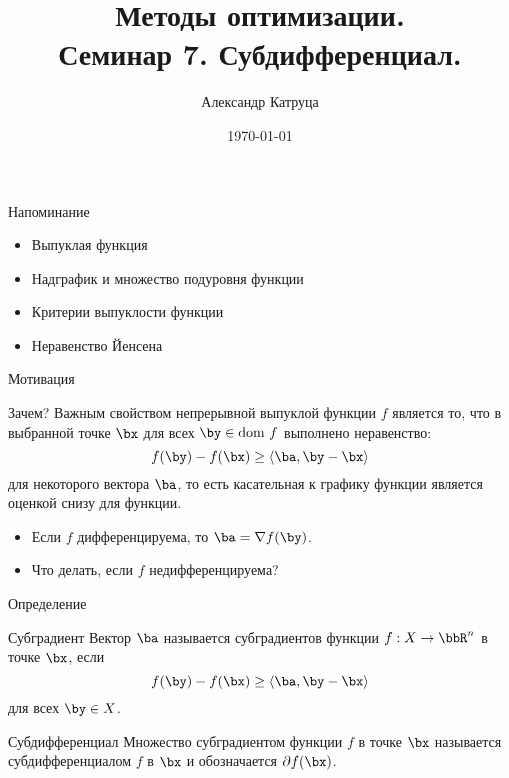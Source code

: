 \documentclass[12pt]{beamer}
\title[Семинар 7]{Методы оптимизации. \\
 Семинар 7. Субдифференциал.}
\author{Александр Катруца}
\institute{Московский физико-технический институт,\\
Факультет Управления и Прикладной Математики}
\date{\today}
\begin{document}
\begin{frame}
\maketitle
\end{frame}

\begin{frame}{Напоминание}
\begin{itemize}
\item Выпуклая функция
\item Надграфик и множество подуровня функции
\item Критерии выпуклости функции
\item Неравенство Йенсена
\end{itemize}
\end{frame}

\begin{frame}{Мотивация}
\begin{block}{Зачем?}
Важным свойством непрерывной выпуклой функции $f$ является то, что в выбранной точке $\bx$ для всех $\by \in \text{dom } f$ выполнено неравенство:
\vspace{-3mm} 
\[
f(\by) - f(\bx) \geq \langle \ba, \by - \bx \rangle
\vspace{-4mm}
\]
для некоторого вектора $\ba$, то есть касательная к графику функции является {\color{red}{глобальной}} оценкой снизу для функции. 
\end{block}

\begin{itemize}
\item Если $f$ дифференцируема, то $\ba = \nabla f(\by)$.
\item Что делать, если $f$ недифференцируема?
\end{itemize}

\end{frame}

\begin{frame}{Определение}
\begin{block}{Субградиент}
Вектор $\ba$ называется субградиентов функции $f: X \rightarrow \bbR^n$ в точке $\bx$, если 
\vspace{-3mm}
\[
f(\by) - f(\bx) \geq \langle \ba, \by - \bx \rangle
\]
для всех $\by \in X$.
\end{block}

\begin{block}{Субдифференциал}
Множество субградиентом функции $f$ в точке $\bx$ называется субдифференциалом $f$ в $\bx$ и обозначается $\partial f(\bx)$.
\end{block}
\end{frame}
\end{document}
